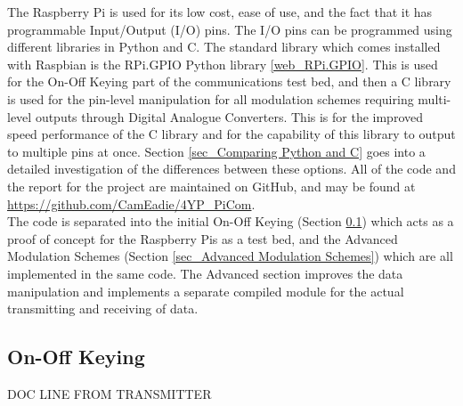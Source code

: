 \documentclass[../main.tex]{subfiles}
\begin{document}
The Raspberry Pi is used for its low cost, ease of use, and the fact that it has programmable Input/Output (I/O) pins.
The I/O pins can be programmed using different libraries in Python and C.
The standard library which comes installed with Raspbian is the RPi.GPIO Python library \ref{web_RPi.GPIO}.
This is used for the On-Off Keying part of the communications test bed, and then a C library is used for the pin-level manipulation for all modulation schemes requiring multi-level outputs through Digital Analogue Converters.
This is for the improved speed performance of the C library and for the capability of this library to output to multiple pins at once.
Section \ref{sec_Comparing Python and C} goes into a detailed  investigation of the differences between these options.
All of the code and the report for the project are maintained on GitHub, and may be found at \url{https://github.com/CamEadie/4YP_PiCom}.\\

The code is separated into the initial On-Off Keying (Section \ref{sec_On-Off Keying}) which acts as a proof of concept for the Raspberry Pis as a test bed, and the Advanced Modulation Schemes (Section \ref{sec_Advanced Modulation Schemes}) which are all implemented in the same code.
The Advanced section improves the data manipulation and implements a separate compiled module for the actual transmitting and receiving of data.

\subsection{On-Off Keying} \label{sec_On-Off Keying}

DOC LINE FROM TRANSMITTER
\end{document}
